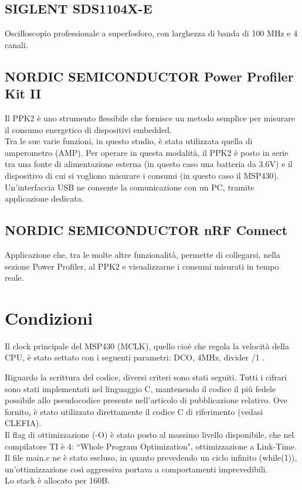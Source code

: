\documentclass[target=bach,aauheader=,style=]{thud}
\begin{document}
		\subsection{SIGLENT SDS1104X-E}
		Oscilloscopio professionale a superfosforo, con larghezza di banda di 100 MHz e 4 canali.
		
		\subsection{NORDIC SEMICONDUCTOR Power Profiler Kit II}
		Il PPK2 è uno strumento flessibile che fornisce un metodo semplice per misurare il consumo energetico di dispositivi embedded.\\
		Tra le sue varie funzioni, in questo studio, è stata utilizzata quella di amperometro (AMP). Per operare in questa modalità, il PPK2 è posto in serie tra una fonte di alimentazione esterna (in questo caso una batteria da 3.6V) e il dispositivo di cui si vogliono misurare i consumi (in questo caso il MSP430).\\
		Un'interfaccia USB ne consente la comunicazione con un PC, tramite applicazione dedicata.
		
		\subsection{NORDIC SEMICONDUCTOR nRF Connect}
		Applicazione che, tra le molte altre funzionalità, permette di collegarsi, nella sezione Power Profiler, al PPK2 e visualizzarne i consumi misurati in tempo reale.
	\section{Condizioni}
	Il clock principale del MSP430 (MCLK), quello cioè che regola la velocità della CPU, è stato settato con i seguenti parametri: DCO, 4MHz, divider /1 \cite{mspuser}.
	
	Riguardo la scrittura del codice, diversi criteri sono stati seguiti. Tutti i cifrari sono stati implementati nel linguaggio C, mantenendo il codice il più fedele possibile allo pseudocodice presente nell'articolo di pubblicazione relativo. Ove fornito, è stato utilizzato direttamente il codice C di riferimento (vedasi CLEFIA).\\
	Il flag di ottimizzazione (-O) è stato posto al massimo livello disponibile, che nel compilatore TI è 4: ``Whole Program Optimization", ottimizzazione a Link-Time\cite{ticompiler}. Il file main.c ne è stato escluso, in quanto prevedendo un ciclo infinito (while(1)), un'ottimizzazione così aggressiva portava a comportamenti imprevedibili.\\
	Lo stack è allocato per 160B.
	
\end{document}
